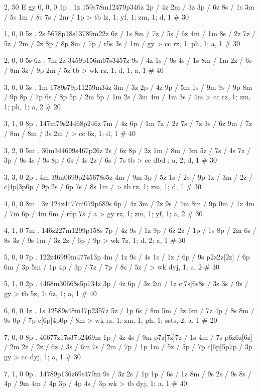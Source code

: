 2, 50
E
gy
0, 0, 0
1p . 1z
159s78m12479p346z
2p / 4z
2m / 3z
3p / 6z
8s / 1s
3m / 5s
1m / 8s
7s /
2m / 1p
> tb
lz, 1; yf, 1; zm, 1; d, 1 # 30

1, 0, 0
5z . 2s
5678p18s13789m22z
6z / 1s
8m /
7z /
5s / 6z
4m / 1m
8s / 2z
7z /
5z /
2m / 2z
8p / 8p
8m /
7p / r5s
3s /
1m /
gy > cc
rz, 1; ph, 1; a, 1 # 30

2, 0, 0
5s 6z . 7m 2z
3459p156m67s3457z
9s / 4z
1s / 9s
4s / 1s
8m / 1m
2z /
6s / 8m
3z / 9p
2m / 5z
tb > wk
rz, 1; d, 1; a, 1 # 40

3, 0, 0
3s . 1m
1789s79p11259m34z
3m / 3z
2p / 4z
9p / 5m
1s / 9m
9s / 9p
8m / 9p
8p / 7p
6s / 8p
5p / 2m
5p / 1m
2s / 3m
4m / 1m
3s / 4m
> cc
rz, 1; zm, 1; ph, 1; a, 2 # 20

3, 1, 0
8p . 
147m79s24468p246z
7m / 4z
6p / 1m
7z / 2z
7s / 7z
3s / 6z
9m /
7z /
8m /
8m / 3s
2m /
> cc
6z, 1; d, 1 # 40

3, 2, 0
5m . 
36m344699s467p26z
2s / 6z
8p / 2z
1m / 
8m / 3m
5z /
7s / 4s
7z / 
3p / 9s
4s / 9s
8p / 
6s / 4s
2z / 
6s / 7s
tb > cc
dbd ; a, 2; d, 1 # 30

3, 3, 0
2p . 4m
39m0699p245678s5z
4m / 9m
3p / 5z
1s / 
2s / 9p
1z / 
3m / 
2z /
c[4p]3p0p / 9p
2s / 6p
7s / 8s
1m / 
> tb
rz, 1; zm, 1; d, 1 # 30 

4, 0, 0
8m . 3z
124z4477m079p689s
6p / 4z
3m / 2z
9s / 4m
8m / 9p
0m / 1z
4m / 7m
6p / 4m
6m / r6p
7s / a
> gy
rz, 1; zm, 1; yf, 1; a, 2 # 30

4, 1, 0
7m . 
146z227m1299p158s
7p / 4z
9s / 1z
9p / 6z
2z / 
1p / 1s
8p / 2m
6s / 8s
3z / 9s
1m / 3z
2z / 
6p / 9p
> wk
7z, 1; d, 2; a, 1 # 30

5, 0, 0
7p . 
122z46999m477s13p
4m / 1z
9s / 4s
1s / 
1z / 
6p / 9s
p2z2z[2z] / 6p
6m / 3p
5m / 1p
4p / 
3p / 
7z / 
7p / 
8s / 
5z / 
> wk
dyj, 1; a, 2 # 30

5, 1, 0
2p . 
4468m30668s5p134z
3p / 4z
6p / 3z
2m / 1z
c[7s]6s8s / 3s
3s / 
9s / 
gy > tb
5z, 1; 6z, 1; a, 1 # 40

6, 0, 0
1z . 1s
12589s48m17p2357z
5z / 1p
6s / 8m
5m / 3z
6m / 7z 
4p / 8s 
8m / 9s 
0p / 7p 
c[6p]4p0p / 8m 
> wk
rz, 1; zm, 1; ph, 1; ssts, 2; a, 1 # 20

7, 0, 0
8p . 
46677z17s37p2469m
1p / 4z 
4s / 9m 
p7z[7z]7z / 1s 
4m / 7s 
p6z6z[6z] / 2m 
2z / 
2z / 
6z / 
3s / 6m 
7s / 
2m / 
7p / 1p 
1m / 
5z / 
5p / 7p 
c[6p]5p7p / 3p
gy > cc
dyj, 1; a, 1 # 30

7, 1, 0
0p . 
14789p136z69s479m
9s / 3z 
2s / 1p 
1p / 
6s / 1z 
8m / 9s 
2s / 9s 
8s / 
4p / 9m 
4m / 4p 
3p / 4p 
4s / 3p 
wk > tb 
dyj, 1; a, 1 # 40
